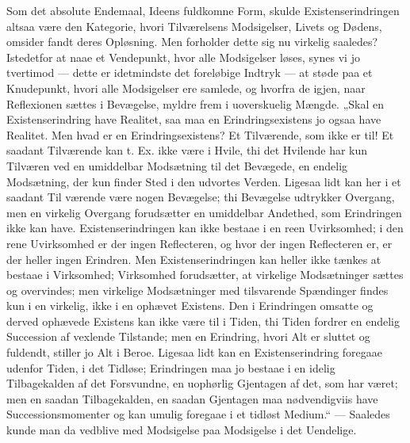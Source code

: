 \documentclass[11pt]{book}
\newcommand{\opage}[1]{\marginnote{\footnotesize\textit{[#1]}}}
\begin{document}
Som det absolute Endemaal, Ideens fuldkomne Form, skulde Existenserindringen
altsaa være den Kategorie, hvori Tilværelsens Modsigelser, Livets og Dødens,
omsider fandt deres Opløsning. Men forholder dette sig nu virkelig saaledes?
Istedetfor at naae et Vendepunkt, hvor alle Modsigelser løses, synes vi jo
tvertimod --- dette er idetmindste det foreløbige Indtryk --- at støde paa
et Knudepunkt, hvori alle Modsigelser ere samlede, og hvorfra de igjen, naar
Reflexionen sættes i Bevægelse, myldre frem i uoverskuelig Mængde. „Skal en
Existenserindring have Realitet, saa maa en Erindringsexistens jo ogsaa have
Realitet. Men hvad er en Erindringsexistens? Et Tilværende, som ikke er til!
Et saadant Tilværende kan t. Ex. ikke være i Hvile, thi det Hvilende har kun
Tilværen ved en umiddelbar Modsætning til det Bevægede, en endelig
Modsætning, der kun finder Sted i den udvortes Verden. Ligesaa lidt kan her
i et saadant Til\-%
\opage{285} \setcounter{footnote}{0}%
værende være nogen Bevægelse; thi Bevægelse udtrykker Overgang, men en
virkelig Overgang forudsætter en umiddelbar Andethed, som Erindringen ikke
kan have. Existenserindringen kan ikke bestaae i en reen Uvirksomhed; i den
rene Uvirksomhed er der ingen Reflecteren, og hvor der ingen Reflecteren er,
er der heller ingen Erindren. Men Existenserindringen kan heller ikke tænkes
at bestaae i Virksomhed; Virksomhed forudsætter, at virkelige Modsætninger
sættes og overvindes; men virkelige Modsætninger med tilsvarende Spændinger
findes kun i en virkelig, ikke i en ophævet Existens. Den i Erindringen
omsatte og derved ophævede Existens kan ikke være til i Tiden, thi Tiden
fordrer en endelig Succession af vexlende Tilstande; men en Erindring, hvori
Alt er sluttet og fuldendt, stiller jo Alt i Beroe. Ligesaa lidt kan en
Existenserindring foregaae udenfor Tiden, i det Tidløse; Erindringen maa jo
bestaae i en idelig Tilbagekalden af det Forsvundne, en uophørlig Gjentagen
af det, som har været; men en saadan Tilbagekalden, en saadan Gjentagen maa
nødvendigviis have Successionsmomenter og kan umulig foregaae i et tidløst
Medium.“ --- Saaledes kunde man da vedblive med Modsigelse paa Modsigelse i
det Uendelige.
\end{document}
